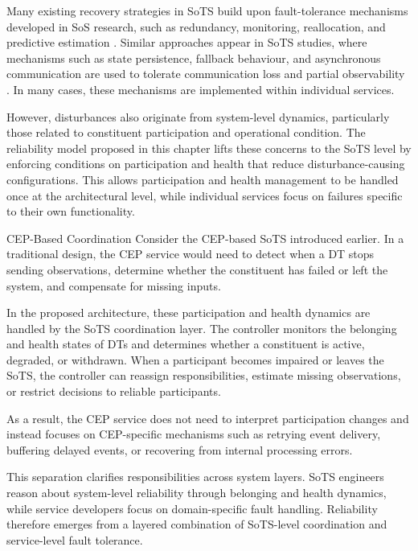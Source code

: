 Many existing recovery strategies in SoTS build upon fault-tolerance mechanisms developed in SoS research, such as redundancy, monitoring, reallocation, and predictive estimation \cite{ferreira2021reliability,uday2015designing,abdelmoumen2026comprehensive}. Similar approaches appear in SoTS studies, where mechanisms such as state persistence, fallback behaviour, and asynchronous communication are used to tolerate communication loss and partial observability \cite{esterle2021digital,larsen2024towards,lopez2023modeling,chen2018digital,joseph2021aggregated}. In many cases, these mechanisms are implemented within individual services.

However, disturbances also originate from system-level dynamics, particularly those related to constituent participation and operational condition. The reliability model proposed in this chapter lifts these concerns to the SoTS level by enforcing conditions on participation and health that reduce disturbance-causing configurations. This allows participation and health management to be handled once at the architectural level, while individual services focus on failures specific to their own functionality.

\begin{runningexample}{CEP-Based Coordination}
Consider the CEP-based SoTS introduced earlier. In a traditional design, the CEP service would need to detect when a DT stops sending observations, determine whether the constituent has failed or left the system, and compensate for missing inputs.

In the proposed architecture, these participation and health dynamics are handled by the SoTS coordination layer. The controller monitors the belonging and health states of DTs and determines whether a constituent is active, degraded, or withdrawn. When a participant becomes impaired or leaves the SoTS, the controller can reassign responsibilities, estimate missing observations, or restrict decisions to reliable participants.

As a result, the CEP service does not need to interpret participation changes and instead focuses on CEP-specific mechanisms such as retrying event delivery, buffering delayed events, or recovering from internal processing errors.
\end{runningexample}

This separation clarifies responsibilities across system layers. SoTS engineers reason about system-level reliability through belonging and health dynamics, while service developers focus on domain-specific fault handling. Reliability therefore emerges from a layered combination of SoTS-level coordination and service-level fault tolerance.

